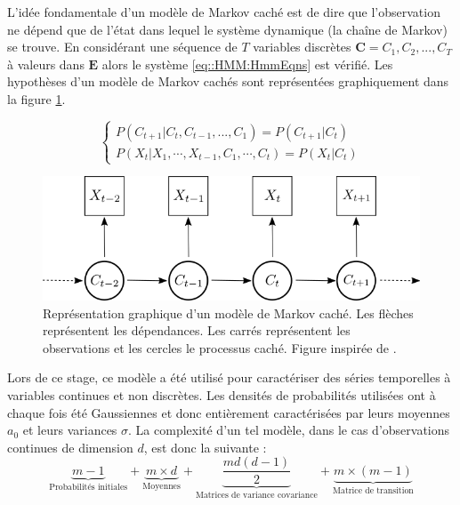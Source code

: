 \documentclass[12pt, french]{report}
\begin{document}
L'idée fondamentale d'un modèle de Markov caché est de dire que l'observation ne dépend que de l'état dans lequel le système dynamique (la chaîne de Markov) se trouve. En considérant une séquence de $T$ variables discrètes $\bm{C}=C_1,C_2,...,C_T$ à valeurs dans $\bm{E}$ alors le système \eqref{eq::HMM:HmmEqns} est vérifié. Les hypothèses d'un modèle de Markov cachés sont représentées graphiquement dans la figure \ref{fig::HMM:HMM_Graph}. 

\begin{equation}
\begin{cases}
P\left( C_{t+1} | C_t,C_{t-1},...,C_1  \right) = P\left( C_{t+1} | C_t  \right)\\
P\left( X_t |  X_1 , \cdots , X_{t-1},  C_1, \cdots, C_t \right)  = P(X_t | C_t)
\end{cases}
\label{eq::HMM:HmmEqns}
\end{equation}

\begin{figure}[ht]
	\begin{center}
		\includegraphics[width= 0.6 \textwidth]{Images/Models/HMM/HMM.png}
		\caption{Représentation graphique d'un modèle de Markov caché. Les flèches représentent les dépendances. Les carrés représentent les observations et les cercles le processus caché. Figure inspirée de \cite{zucchini_hidden_2017}.}
		\label{fig::HMM:HMM_Graph}
	\end{center}
\end{figure}


Lors de ce stage, ce modèle a été utilisé pour caractériser des séries temporelles à variables continues et non discrètes. Les densités de probabilités utilisées ont à chaque fois été Gaussiennes et donc entièrement caractérisées par leurs moyennes $a_0$ et leurs variances $\sigma$. La complexité d'un tel modèle, dans le cas d'observations continues de dimension $d$, est donc la suivante :
\begin{equation}
\underbrace{m-1}_\text{Probabilités initiales}  + \underbrace{m \times d}_\text{Moyennes}  +  \underbrace{\frac{md \left(d - 1\right)}{2}}_\text{Matrices de variance covariance} + \underbrace{m \times (m-1)}_\text{Matrice de transition}
\label{eq:Model_HMM_ParamNumber} 
\end{equation}
\end{document}
